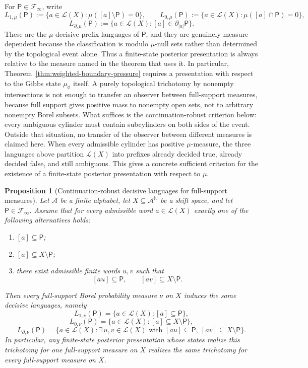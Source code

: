 \documentclass{etds}%
\numberwithin{equation}{section}
\theoremstyle{plain}
\newtheorem{proposition}[theorem]{Proposition}
\theoremstyle{definition}
\theoremstyle{remark}
\newcommand{\NN}{\mathbb{N}}
\begin{document}
For $\mathsf{P}\in\mathcal{F}_\infty$, write
\[
L_{1,\mu}(\mathsf{P})
:=\{a\in\mathcal{L}(X):\mu([a]\setminus\mathsf{P})=0\},
\qquad
L_{0,\mu}(\mathsf{P})
:=\{a\in\mathcal{L}(X):\mu([a]\cap\mathsf{P})=0\},
\]
\[
L_{\partial,\mu}(\mathsf{P})
:=\{a\in\mathcal{L}(X):[a]\in\partial_{|a|}\mathsf{P}\}.
\]
These are the $\mu$-decisive prefix languages of $\mathsf{P}$, and they are
genuinely measure-dependent because the classification is modulo $\mu$-null
sets rather than determined by the topological event alone.  Thus a
finite-state posterior presentation is always relative to the measure named in
the theorem that uses it.  In particular,
Theorem~\ref{thm:weighted-boundary-pressure} requires a presentation with
respect to the Gibbs state $\mu_\phi$ itself.  A purely topological
trichotomy by nonempty intersections is not enough to transfer an observer
between full-support measures, because full support gives positive mass to
nonempty open sets, not to arbitrary nonempty Borel subsets.  What suffices is
the continuation-robust criterion below: every ambiguous cylinder must contain
subcylinders on both sides of the event.  Outside that situation, no transfer
of the observer between different measures is claimed here.  When every
admissible cylinder has positive $\mu$-measure, the three languages above
partition $\mathcal{L}(X)$ into prefixes already decided true, already decided
false, and still ambiguous.  This gives a concrete sufficient criterion for
the existence of a finite-state posterior presentation with respect to $\mu$.

\begin{proposition}[Continuation-robust decisive languages for full-support measures]
\label{prop:full-support-invariant-decisive-languages}
Let $\mathcal{A}$ be a finite alphabet, let $X\subseteq\mathcal{A}^{\NN}$ be a
shift space, and let $\mathsf{P}\in\mathcal{F}_\infty$.  Assume that for every
admissible word $a\in\mathcal{L}(X)$ exactly one of the following alternatives
holds:
\begin{enumerate}[label=(\alph*)]
\item $[a]\subseteq \mathsf{P}$;
\item $[a]\subseteq X\setminus \mathsf{P}$;
\item there exist admissible finite words $u,v$ such that
  \[
  [au]\subseteq \mathsf{P},
  \qquad
  [av]\subseteq X\setminus \mathsf{P}.
  \]
\end{enumerate}
Then every full-support Borel probability measure $\nu$ on $X$ induces the
same decisive languages, namely
\[
L_{1,\nu}(\mathsf{P})=\{a\in\mathcal{L}(X):[a]\subseteq \mathsf{P}\},
\]
\[
L_{0,\nu}(\mathsf{P})=\{a\in\mathcal{L}(X):[a]\subseteq X\setminus \mathsf{P}\},
\]
\[
L_{\partial,\nu}(\mathsf{P})
=\{a\in\mathcal{L}(X):\exists\,u,v\in\mathcal{L}(X)\text{ with }
[au]\subseteq \mathsf{P},\ [av]\subseteq X\setminus \mathsf{P}\}.
\]
In particular, any finite-state posterior presentation whose states realize
this trichotomy for one full-support measure on $X$ realizes the same
trichotomy for every full-support measure on $X$.
\end{proposition}
\end{document}
